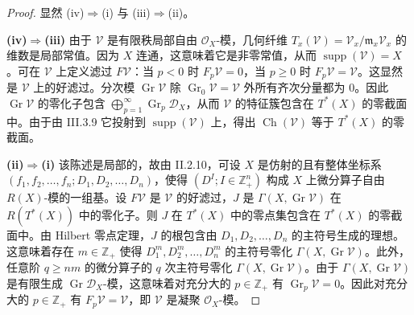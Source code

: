 \begin{proof}
显然 (iv)$\Rightarrow$(i) 与 (iii)$\Rightarrow$(ii)。

\textbf{(iv)$\Rightarrow$(iii)} 由于 $\mathcal{V}$ 是有限秩局部自由 $\mathcal{O}_X$-模，几何纤维
$T_x(\mathcal{V})=\mathcal{V}_x/\mathfrak{m}_x\mathcal{V}_x$ 的维数是局部常值。因为 $X$ 连通，这意味着它是非零常值，从而
$\operatorname{supp}(\mathcal{V})=X$。可在 $\mathcal{V}$ 上定义滤过 $F\mathcal{V}$：当 $p<0$ 时 $F_p\mathcal{V}=0$，当 $p\ge0$ 时 $F_p\mathcal{V}=\mathcal{V}$。这显然是 $\mathcal{V}$ 上的好滤过。分次模 $\operatorname{Gr}\mathcal{V}$ 除
$\operatorname{Gr}_0\mathcal{V}=\mathcal{V}$ 外所有齐次分量都为 0。因此 $\operatorname{Gr}\mathcal{V}$ 的零化子包含
$\bigoplus_{p=1}^{\infty}\operatorname{Gr}_p\mathcal{D}_X$，从而 $\mathcal{V}$ 的特征簇包含在 $T^*(X)$ 的零截面中。由于由 III.3.9 它投射到 $\operatorname{supp}(\mathcal{V})$ 上，得出 $\operatorname{Ch}(\mathcal{V})$ 等于 $T^*(X)$ 的零截面。

\textbf{(ii)$\Rightarrow$(i)} 该陈述是局部的，故由 II.2.10，可设 $X$ 是仿射的且有整体坐标系
$(f_1,f_2,\dots,f_n;D_1,D_2,\dots,D_n)$，使得 $(D^I;I\in\mathbb{Z}_+^n)$ 构成 $X$ 上微分算子自由 $R(X)$-模的一组基。设 $F\mathcal{V}$ 是 $\mathcal{V}$ 的好滤过，$J$ 是 $\Gamma(X,\operatorname{Gr}\mathcal{V})$ 在 $R(T^*(X))$ 中的零化子。则 $J$ 在 $T^*(X)$ 中的零点集包含在 $T^*(X)$ 的零截面中。由 Hilbert 零点定理，$J$ 的根包含由 $D_1,D_2,\dots,D_n$ 的主符号生成的理想。这意味着存在 $m\in\mathbb{Z}_+$ 使得 $D_1^m,D_2^m,\dots,D_n^m$ 的主符号零化 $\Gamma(X,\operatorname{Gr}\mathcal{V})$。此外，任意阶 $q\ge nm$ 的微分算子的 $q$ 次主符号零化 $\Gamma(X,\operatorname{Gr}\mathcal{V})$。由于 $\Gamma(X,\operatorname{Gr}\mathcal{V})$ 是有限生成 $\operatorname{Gr}\mathcal{D}_X$-模，这意味着对充分大的 $p\in\mathbb{Z}_+$ 有 $\operatorname{Gr}_p\mathcal{V}=0$。因此对充分大的 $p\in\mathbb{Z}_+$ 有 $F_p\mathcal{V}=\mathcal{V}$，即 $\mathcal{V}$ 是凝聚 $\mathcal{O}_X$-模。


\end{proof}
